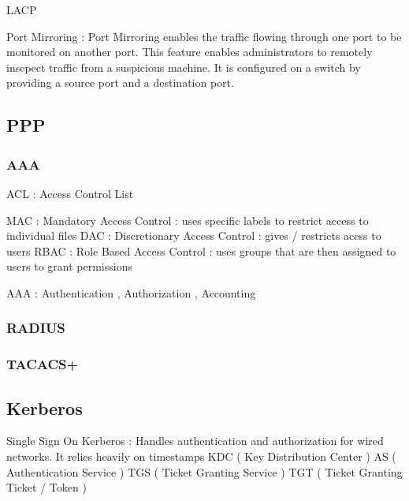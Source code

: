 LACP

Port Mirroring : Port Mirroring enables the traffic flowing through one port to
be monitored on another port. This feature enables administrators to remotely
insepect traffic from a suspicious machine. It is configured on a switch by
providing a source port and a destination port.


\subsectionend

\subsection{PPP}
\label{ssec:ppp}

\subsubsection{AAA}
\label{sssec:aaa}

ACL : Access Control List

MAC : Mandatory Access Control : uses specific labels to restrict access to
individual files
DAC : Discretionary Access Control : gives / restricts acess to users
RBAC : Role Based Access Control : uses groups that are then assigned to users
to grant permissions

AAA : Authentication , Authorization , Accounting


\subsubsectionend

\subsubsection{RADIUS}
\label{sssec:radius}



\subsubsectionend

\subsubsection{TACACS+}
\label{sssec:tacacs}



\subsubsectionend

\subsectionend

\subsection{Kerberos}
\label{ssec:kerberos}
Single Sign On
Kerberos : Handles authentication and authorization for wired networks. It
relies heavily on timestamps
KDC ( Key Distribution Center )
AS ( Authentication Service )
TGS ( Ticket Granting Service ) 
TGT ( Ticket Granting Ticket / Token )

